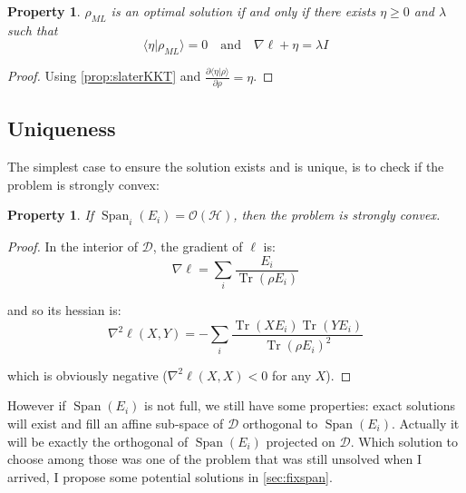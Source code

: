 \documentclass[10pt,a4paper]{report}
\theoremstyle{plain}
\newtheorem{prop}[thm]{Property}
\theoremstyle{definition}
\theoremstyle{remark}
\newcommand{\braket}[2]{\langle#1|#2\rangle}
\newcommand{\dpar}[2]{\frac{\partial{#1}}{\partial{#2}}}
\renewcommand{\geq}{\geqslant}
\DeclareMathOperator{\Tr}{Tr}
\DeclareMathOperator{\Span}{Span}
\newcommand{\ml}{_{M\!L}}
\begin{document}
\begin{prop}\label{prop:caracKKT}
  $\rho\ml$ is an optimal solution if and only if there
exists $\eta \geq 0$ and $\lambda$ such that
\[\braket \eta {\rho\ml} = 0 \quad \text{and} \quad \nabla \ell + \eta =
  \lambda I\]
\end{prop}

\begin{proof}
  Using \cref{prop:slaterKKT} and $\displaystyle\dpar{\braket \eta \rho}\rho = \eta$.
\end{proof}




\subsection{Uniqueness}\label{ssec:uniq}

The simplest case to ensure the solution exists and is unique, is to check if
the problem is strongly convex:

\begin{prop}
  If $\Span_i(E_i) = \mathcal{O}(\mathcal{H})$, then the problem is strongly convex.
\end{prop}

\begin{proof} In the interior of $\mathcal{D}$, the gradient of $\ell$ is:
\begin{equation}
\nabla \ell = \sum_i \frac{E_i}{\Tr(\rho E_i)}
\end{equation}

and so its hessian is:
\begin{equation}
\nabla^2 \ell(X,Y) = - \sum_i \frac{\Tr(XE_i)\Tr(YE_i)}{\Tr(\rho E_i)^2}
\end{equation}

which is obviously negative ($\nabla^2 \ell(X,X) < 0$ for any $X$).
\end{proof}

However if $\Span(E_i)$ is not full, we still have some properties: exact
solutions will exist and fill an affine sub-space of $\mathcal{D}$ orthogonal to
$\Span(E_i)$. Actually it will be exactly the orthogonal of $\Span(E_i)$
projected on $\mathcal{D}$. Which solution to choose among those was one of the problem that
was still unsolved when I arrived, I propose some potential solutions in \cref{sec:fixspan}.
\end{document}
